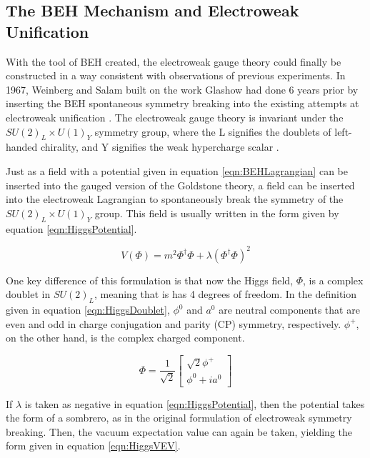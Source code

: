 \documentclass[12pt]{ucsddissertation}
\begin{document}
\subsection{The BEH Mechanism and Electroweak Unification}

With the tool of BEH created, the electroweak gauge theory could finally be constructed in a way consistent with observations of previous experiments. In 1967, Weinberg and Salam built on the work Glashow had done 6 years prior by inserting the BEH spontaneous symmetry breaking into the existing attempts at electroweak unification \cite{CMS10YearReview}. The electroweak gauge theory is invariant under the $SU(2)_L \times U(1)_Y$ symmetry group, where the L signifies the doublets of left-handed chirality, and Y signifies the weak hypercharge scalar \cite{PDGReview}.

Just as a field with a potential given in equation \ref{eqn:BEHLagrangian} can be inserted into the gauged version of the Goldstone theory, a field can be inserted into the electroweak Lagrangian to spontaneously break the symmetry of the $SU(2)_L \times U(1)_Y$ group. This field is usually written in the form given by equation \ref{eqn:HiggsPotential}.

\begin{equation}\label{eqn:HiggsPotential}
    V(\Phi) = m^2 \Phi^{\dagger} \Phi + \lambda (\Phi^{\dagger}\Phi)^2
\end{equation}

One key difference of this formulation is that now the Higgs field, $\Phi$, is a complex doublet in $SU(2)_L$, meaning that is has 4 degrees of freedom. In the definition given in equation \ref{eqn:HiggsDoublet}, $\phi^0$ and $a^0$ are neutral components that are even and odd in charge conjugation and parity (CP) symmetry, respectively. $\phi^+$, on the other hand, is the complex charged component. 

\begin{equation}\label{eqn:HiggsDoublet}
\Phi = \frac{1}{\sqrt{2}} \begin{bmatrix} \sqrt{2}\phi^+ \\ \phi^0 + ia^0 \end{bmatrix}
\end{equation}

If $\lambda$ is taken as negative in equation \ref{eqn:HiggsPotential}, then the potential takes the form of a sombrero, as in the original formulation of electroweak symmetry breaking. Then, the vacuum expectation value can again be taken, yielding the form given in equation \ref{eqn:HiggsVEV}.
\end{document}
